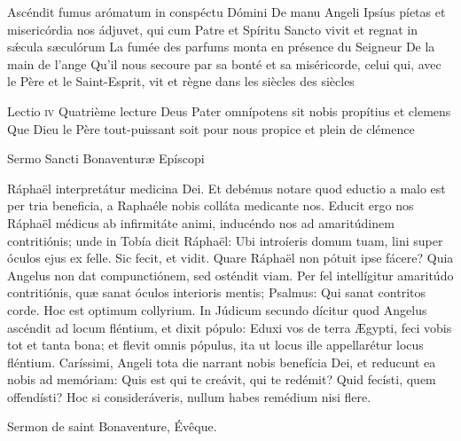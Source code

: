 \documentclass[twoside]{article}
\begin{document}
\begin{paracol}[1]{2}
\switchcolumn*

\versiculusabsolutio
	{Ascéndit fumus arómatum in conspéctu Dómini}
	{De manu Angeli}
	{Ipsíus píetas et misericórdia nos ádjuvet, qui cum Patre et Spíritu Sancto vivit et regnat in sǽcula sæculórum}
	{La fumée des parfums monta en présence du Seigneur}
	{De la main de l’ange}
	{Qu'il nous secoure par sa bonté et sa miséricorde, celui qui, avec le Père et le Saint-Esprit, vit et règne dans les siècles des siècles}

\lectioresponsorium
	{Lectio \textsc{iv}}
	{Quatrième lecture}
	{Deus Pater omnípotens sit nobis propítius et clemens}
	{Que Dieu le Père tout-puissant soit pour nous propice et plein de clémence}
	{
		Sermo Sancti Bonaventuræ Epíscopi
		
		Ráphaël interpretátur medicina Dei. Et debémus notare quod eductio a malo est per tria beneficia, a Raphaéle nobis colláta medicante nos. Educit ergo nos Ráphaël médicus ab infirmitáte animi, inducéndo nos ad amaritúdinem contritiónis; unde in Tobía dicit Ráphaël: Ubi introíeris domum tuam, lini super óculos ejus ex felle. Sic fecit, et vidit. Quare Ráphaël non pótuit ipse fácere? Quia Angelus non dat compunctiónem, sed osténdit viam. Per fel intellígitur amaritúdo contritiónis, quæ sanat óculos interioris mentis; Psalmus: Qui sanat contritos corde. Hoc est optimum collyrium. In Júdicum secundo dícitur quod Angelus ascéndit ad locum fléntium, et dixit pópulo: Eduxi vos de terra Ægypti, feci vobis tot et tanta bona; et flevit omnis pópulus, ita ut locus ille appellarétur locus fléntium. Caríssimi, Angeli tota die narrant nobis benefícia Dei, et reducunt ea nobis ad memóriam: Quis est qui te creávit, qui te redémit? Quid fecísti, quem offendísti? Hoc si consideráveris, nullum habes remédium nisi flere.
		
	}
	{
		
		Sermon de saint Bonaventure, Évêque.
		
}
\end{paracol}
\end{document}
